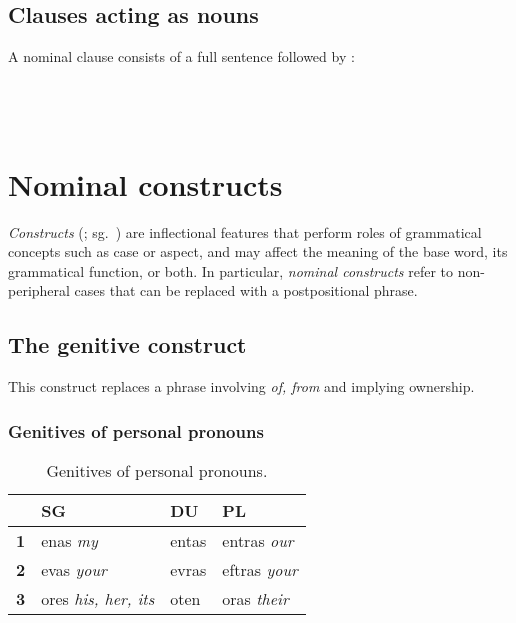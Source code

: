 \documentclass{book}
\begin{document}
\section{Clauses acting as nouns}

A nominal clause consists of a full sentence followed by : \\
~\\
       \\
       \\
     

\chapter{Nominal constructs}

\emph{Constructs} (; sg.~) are inflectional features that perform roles of grammatical concepts such as case or aspect, and may affect the meaning of the base word, its grammatical function, or both. In particular, \emph{nominal constructs} refer to non-peripheral cases that can be replaced with a postpositional phrase.

\section{The genitive construct}

This construct replaces a phrase involving  \emph{of, from} and implying ownership.

\subsection{Genitives of personal pronouns}

\begin{table}[h]
  \caption{Genitives of personal pronouns.}
  \centering
  \begin{tabular}{|r|l|l|l|}
    \hline
    & \textbf{SG} & \textbf{DU} & \textbf{PL} \\ \hline
    \textbf{1} & enas \emph{my} & entas & entras \emph{our} \\ \hline
    \textbf{2} & evas \emph{your} & evras & eftras \emph{your} \\ \hline
    \textbf{3} & ores \emph{his, her, its} & oten & oras \emph{their} \\ \hline
  \end{tabular}
\end{table}
\end{document}
